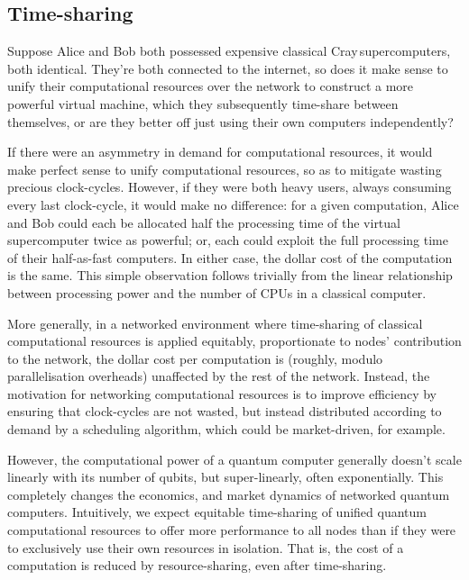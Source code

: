 %
%

\subsection{Time-sharing}\label{sec:time_share}

Suppose Alice and Bob both possessed expensive classical Cray\texttrademark\,supercomputers, both identical. They're both connected to the internet, so does it make sense to unify their computational resources over the network to construct a more powerful virtual machine, which they subsequently time-share between themselves, or are they better off just using their own computers independently?

If there were an asymmetry in demand for computational resources, it would make perfect sense to unify computational resources, so as to mitigate wasting precious clock-cycles. However, if they were both heavy users, always consuming every last clock-cycle, it would make no difference: for a given computation, Alice and Bob could each be allocated half the processing time of the virtual supercomputer twice as powerful; or, each could exploit the full processing time of their half-as-fast computers. In either case, the dollar cost of the computation is the same. This simple observation follows trivially from the linear relationship between processing power and the number of CPUs in a classical computer.

More generally, in a networked environment where time-sharing of classical computational resources is applied equitably, proportionate to nodes' contribution to the network, the dollar cost per computation is (roughly, modulo parallelisation overheads) unaffected by the rest of the network. Instead, the motivation for networking computational resources is to improve efficiency by ensuring that clock-cycles are not wasted, but instead distributed according to demand by a scheduling algorithm, which could be market-driven, for example.

However, the computational power of a quantum computer generally doesn't scale linearly with its number of qubits, but super-linearly, often exponentially. This completely changes the economics, and market dynamics of networked quantum computers. Intuitively, we expect equitable time-sharing of unified quantum computational resources to offer more performance to all nodes than if they were to exclusively use their own resources in isolation. That is, the cost of a computation is reduced by resource-sharing, even after time-sharing.

